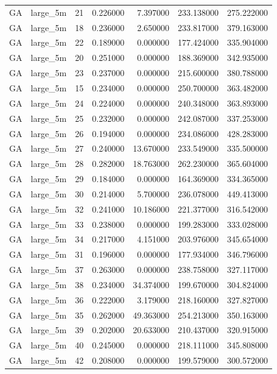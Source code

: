 \begin{tabular}{llrrrrr}
GA & large_5m & 21 & 0.226000 & 7.397000 & 233.138000 & 275.222000 \\
GA & large_5m & 18 & 0.236000 & 2.650000 & 233.817000 & 379.163000 \\
GA & large_5m & 22 & 0.189000 & 0.000000 & 177.424000 & 335.904000 \\
GA & large_5m & 20 & 0.251000 & 0.000000 & 188.369000 & 342.935000 \\
GA & large_5m & 23 & 0.237000 & 0.000000 & 215.600000 & 380.788000 \\
GA & large_5m & 15 & 0.234000 & 0.000000 & 250.700000 & 363.482000 \\
GA & large_5m & 24 & 0.224000 & 0.000000 & 240.348000 & 363.893000 \\
GA & large_5m & 25 & 0.232000 & 0.000000 & 242.087000 & 337.253000 \\
GA & large_5m & 26 & 0.194000 & 0.000000 & 234.086000 & 428.283000 \\
GA & large_5m & 27 & 0.240000 & 13.670000 & 233.549000 & 335.500000 \\
GA & large_5m & 28 & 0.282000 & 18.763000 & 262.230000 & 365.604000 \\
GA & large_5m & 29 & 0.184000 & 0.000000 & 164.369000 & 334.365000 \\
GA & large_5m & 30 & 0.214000 & 5.700000 & 236.078000 & 449.413000 \\
GA & large_5m & 32 & 0.241000 & 10.186000 & 221.377000 & 316.542000 \\
GA & large_5m & 33 & 0.238000 & 0.000000 & 199.283000 & 333.028000 \\
GA & large_5m & 34 & 0.217000 & 4.151000 & 203.976000 & 345.654000 \\
GA & large_5m & 31 & 0.196000 & 0.000000 & 177.934000 & 346.796000 \\
GA & large_5m & 37 & 0.263000 & 0.000000 & 238.758000 & 327.117000 \\
GA & large_5m & 38 & 0.234000 & 34.374000 & 199.670000 & 304.824000 \\
GA & large_5m & 36 & 0.222000 & 3.179000 & 218.160000 & 327.827000 \\
GA & large_5m & 35 & 0.262000 & 49.363000 & 254.213000 & 350.163000 \\
GA & large_5m & 39 & 0.202000 & 20.633000 & 210.437000 & 320.915000 \\
GA & large_5m & 40 & 0.245000 & 0.000000 & 218.111000 & 345.808000 \\
GA & large_5m & 42 & 0.208000 & 0.000000 & 199.579000 & 300.572000 \\

\end{tabular}
